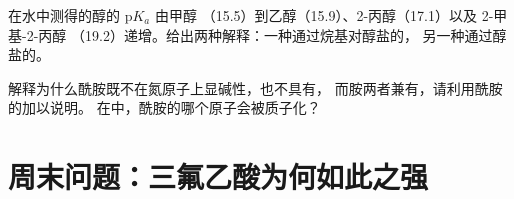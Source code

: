 \begin{exercise}[$\star\star\star$]\label{exo:b1:electronic-effects:11}
在水中测得的醇的 $\mathrm{p}K_a$ 由甲醇
（15.5）到乙醇（15.9）、2-丙醇（17.1）以及 2-甲基-2-丙醇
（19.2）递增。给出两种解释：一种通过烷基对醇盐的，
另一种通过醇盐的。
\end{exercise}

\begin{exercise}[$\star\star\star$]\label{exo:b1:electronic-effects:12}
解释为什么酰胺既不在氮原子上显碱性，也不具有，
而胺两者兼有，请利用酰胺的加以说明。
在中，酰胺的哪个原子会被质子化？
\end{exercise}

\section{周末问题：三氟乙酸为何如此之强}

